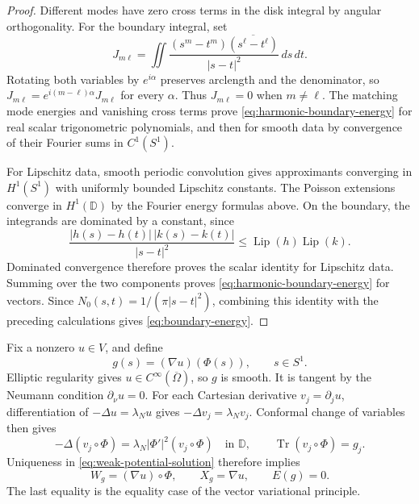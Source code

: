 \begin{proof}
Different modes have zero cross terms in the disk integral by
angular orthogonality. For the boundary integral, set
\[
 J_{m\ell}=\iint
 \frac{(s^m-t^m)\overline{(s^\ell-t^\ell)}}{|s-t|^2}\,ds\,dt.
\]
Rotating both variables by $e^{i\alpha}$ preserves arclength and
the denominator, so
$J_{m\ell}=e^{i(m-\ell)\alpha}J_{m\ell}$ for every $\alpha$.
Thus $J_{m\ell}=0$ when $m\ne\ell$.
The matching mode energies and vanishing cross terms prove
\cref{eq:harmonic-boundary-energy} for real scalar trigonometric
polynomials, and then for smooth data by convergence of their
Fourier sums in $C^1(S^1)$.

For Lipschitz data, smooth periodic convolution gives approximants
converging in $H^1(S^1)$ with uniformly bounded Lipschitz constants.
The Poisson extensions converge in $H^1(\mathbb D)$ by the Fourier
energy formulas above. On the boundary, the integrands are dominated
by a constant, since
\[
 \frac{|h(s)-h(t)|\,|k(s)-k(t)|}{|s-t|^2}
 \le\operatorname{Lip}(h)\operatorname{Lip}(k).
\]
Dominated convergence therefore proves the scalar identity for
Lipschitz data. Summing over the two components proves
\cref{eq:harmonic-boundary-energy} for vectors. Since
$N_0(s,t)=1/(\pi|s-t|^2)$, combining this identity with the preceding
calculations gives \cref{eq:boundary-energy}.
\end{proof}

Fix a nonzero $u\in V$, and define
\begin{equation}\label{eq:gradient-boundary-data}
 g(s)=(\nabla u)(\Phi(s)),\qquad s\in S^1.
\end{equation}
Elliptic regularity
\cite[Chapter III, Theorems 6.4 and 6.5]{Showalter}
gives $u\in C^\infty(\overline\Omega)$, so
$g$ is smooth. It is tangent by the Neumann condition
$\partial_\nu u=0$. For each Cartesian derivative
$v_j=\partial_j u$, differentiation of $-\Delta u=\lambda_Nu$
gives $-\Delta v_j=\lambda_Nv_j$. Conformal change of variables
then gives
\[
 -\Delta(v_j\circ\Phi)
 =\lambda_N|\Phi'|^2(v_j\circ\Phi)
 \quad\text{in }\mathbb D,
 \qquad \operatorname{Tr}(v_j\circ\Phi)=g_j.
\]
Uniqueness in \cref{eq:weak-potential-solution} therefore implies
\begin{equation}\label{eq:gradient-extension}
 W_g=(\nabla u)\circ\Phi,
 \qquad X_g=\nabla u,
 \qquad E(g)=0.
\end{equation}
The last equality is the equality case of the vector variational
principle.

